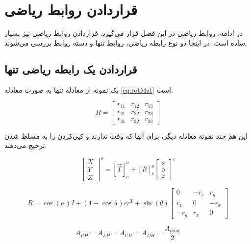 \chapter{
قراردادن روابط ریاضی
}

در ادامه، روابط ریاصی در این فصل قرار می‌گیرد. قراردادن روابط ریاضی نیز بسیار ساده است. در اینجا دو نوع رابطه ریاضی، روابط تنها و دسته روابط بررسی می‌شوند.


\section{ 
قراردادن یک رابطه ریاضی تنها
}
\label{sec:singleEq} 

یک نمونه از معادله تنها به صورت معادله
\ref{eq:rotMat}
است.

\begin{equation}
\label{eq:rotMat}
R = \begin{bmatrix} r_{11} & r_{12} & r_{13} \\ r_{21} & r_{22} & r_{23} \\ r_{31} & r_{32} & r_{33} \end{bmatrix}
\end{equation}

این هم چند نمونه معادله دیگر، برای آنها که وقت ندارند و کپی‌کردن را به مسلط شدن ترجیچ می‌دهند.

\begin{equation}
\label{eq:pointTransform}
\begin{bmatrix} X \\ Y \\ Z \end{bmatrix}^o = [\overrightarrow{T}]_c^o + [R]_c^o \begin{bmatrix} x \\ y \\ z \end{bmatrix}^c
\end{equation} 

\begin{equation}
\label{eq:rotationMatrix}
R = \cos(\alpha)I + (1-\cos{\alpha})rr^T + \sin(\theta)\begin{bmatrix} 0 & -r_z & r_y \\ r_z & 0 & -r_x \\ -r_y & r_x & 0 \end{bmatrix} 
\end{equation}

\begin{equation}
\label{eq:AHs}
A_{RH} = A_{LH} = A_{UH} = A_{DH} = \frac{A_{total}}{2}
\end{equation}

